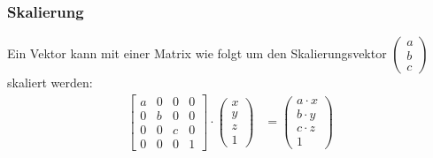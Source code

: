 \documentclass[titlepage, 11pt, a4paper, ngerman]{article}
\begin{document}
\subsubsection{Skalierung}
Ein Vektor kann mit einer Matrix wie folgt um den Skalierungsvektor $\begin{pmatrix}
    a \\
    b \\
    c
    \end{pmatrix}$ skaliert werden:
\begin{align*}
    \begin{bmatrix} 
    a & 0 & 0 & 0 \\
    0 & b & 0 & 0 \\
    0 & 0 & c & 0 \\
    0 & 0 & 0 & 1
    \end{bmatrix} \cdot
    \begin{pmatrix}
    x \\ y \\ z \\ 1
    \end{pmatrix} &= 
    \begin{pmatrix}
    a \cdot x \\
    b \cdot y \\
    c \cdot z \\
    1
    \end{pmatrix}
\end{align*}
\end{document}

